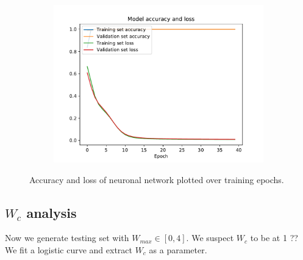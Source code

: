 \documentclass[reprint,amsmath,amssymb,aps,prb]{revtex4-2}
\begin{document}
\begin{figure}[h!]
\begin{subfigure}[c]{0.3\textwidth}
		\label{fig:N11_loss_epochs}
	\end{subfigure}
	\begin{subfigure}[c]{0.3\textwidth}
		\includegraphics[width=\textwidth]{../results/N12_accuracy_loss_epochs}
		\label{fig:N12_loss_epochs}
	\end{subfigure}
	\caption{Accuracy and loss of neuronal network plotted over training epochs.}
\end{figure}



\subsection{$W_c$ analysis}


Now we generate testing set with $W_{max} \in \left[0,4\right]$. We suspect $W_c$ to be at 1 ??%
We fit a logistic curve and extract $W_c$ as a parameter.
\end{document}
